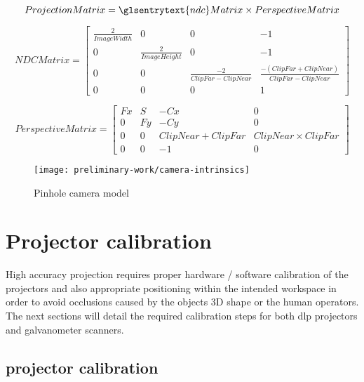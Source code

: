 \begin{equation}\label{eq:projection-matrix}
	ProjectionMatrix = \glsentrytext{ndc}Matrix \times PerspectiveMatrix
\end{equation}

\begin{equation}\label{eq:ndc-matrix}
	NDCMatrix = 
	\begin{bmatrix}
		\frac{2}{ImageWidth} & 0 & 0 & -1 \\
		0 & \frac{2}{ImageHeight} & 0 & -1 \\
		0 & 0 & \frac{-2}{ClipFar - ClipNear} & \frac{-(ClipFar + ClipNear)}{ClipFar - ClipNear} \\
		0 & 0 & 0 & 1
	\end{bmatrix}
\end{equation}


\begin{equation}\label{eq:perspective-matrix}
	PerspectiveMatrix = 
	\begin{bmatrix}
		Fx & S & -Cx & 0 \\
		0 & Fy & -Cy & 0 \\
		0 & 0 & ClipNear + ClipFar & ClipNear \times ClipFar \\
		0 & 0 & -1 & 0
	\end{bmatrix}
\end{equation}


\begin{figure}[H]
	\centering
	\texttt{[image: preliminary-work/camera-intrinsics]}
	\caption{Pinhole camera model\protect\footnotemark}
	\label{fig:camera-intrinsics}
\end{figure}


\section{Projector calibration}

High accuracy projection requires proper hardware / software calibration of the projectors and also appropriate positioning within the intended workspace in order to avoid occlusions caused by the objects 3D shape or the human operators. The next sections will detail the required calibration steps for both \gls{dlp} projectors and galvanometer scanners.


\subsection{ projector calibration}


